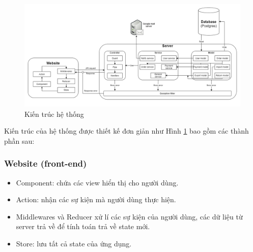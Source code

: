 \begin{figure}[H]
    \begin{center}
        \includegraphics[width=14cm]{Image/Technical/architecture.png}
        \caption{Kiến trúc hệ thống}
        \label{architecture}
    \end{center}
\end{figure}

Kiến trúc của hệ thống được thiết kế đơn giản như Hình \ref{architecture} bao gồm các thành phần sau:
\subsubsection{Website (front-end)}
\begin{itemize}
    \item Component: chứa các view hiển thị cho người dùng.
    \item Action: nhận các sự kiện mà người dùng thực hiện.
    \item Middlewares và Reducer xử lí các sự kiện của người dùng, các dữ liệu từ server trả về để tính toán trả về state mới.
    \item Store: lưu tất cả state của ứng dụng.
\end{itemize}
